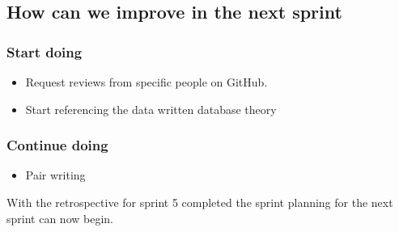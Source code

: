 \subsection{How can we improve in the next sprint}
\subsubsection{Start doing}
\begin{itemize}
    \item Request reviews from specific people on GitHub.
    \item Start referencing the data written database theory
\end{itemize}
\subsubsection{Continue doing}
\begin{itemize}
    \item Pair writing
\end{itemize}

With the retrospective for sprint 5 completed the sprint planning for the next sprint can now begin. 